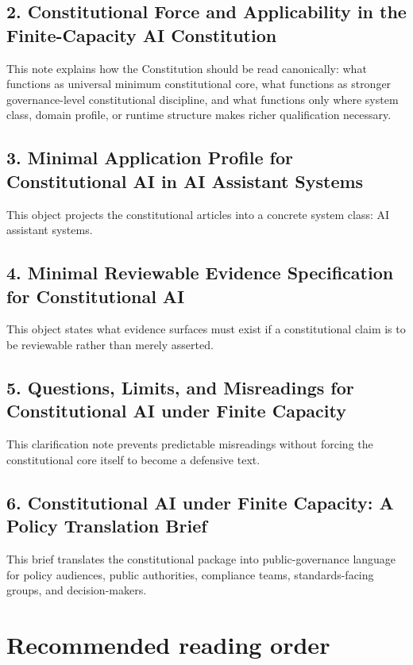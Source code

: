 \documentclass[11pt]{article}
\begin{document}
\subsection*{2. Constitutional Force and Applicability in the Finite-Capacity AI Constitution}
This note explains how the Constitution should be read canonically: what functions as universal minimum constitutional core, what functions as stronger governance-level constitutional discipline, and what functions only where system class, domain profile, or runtime structure makes richer qualification necessary.

\subsection*{3. Minimal Application Profile for Constitutional AI in AI Assistant Systems}
This object projects the constitutional articles into a concrete system class: AI assistant systems.

\subsection*{4. Minimal Reviewable Evidence Specification for Constitutional AI}
This object states what evidence surfaces must exist if a constitutional claim is to be reviewable rather than merely asserted.

\subsection*{5. Questions, Limits, and Misreadings for Constitutional AI under Finite Capacity}
This clarification note prevents predictable misreadings without forcing the constitutional core itself to become a defensive text.

\subsection*{6. Constitutional AI under Finite Capacity: A Policy Translation Brief}
This brief translates the constitutional package into public-governance language for policy audiences, public authorities, compliance teams, standards-facing groups, and decision-makers.

\section{Recommended reading order}
\end{document}
